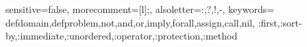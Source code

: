 {
  sensitive=false,      %
  morecomment=[l]{;},   %
  alsoletter={:,?,!,-}, %
  keywords={
    defdomain,defproblem,not,and,or,imply,forall,assign,call,nil,
    :first,:sort-by,:immediate,:unordered,:operator,:protection,:method
  }
}